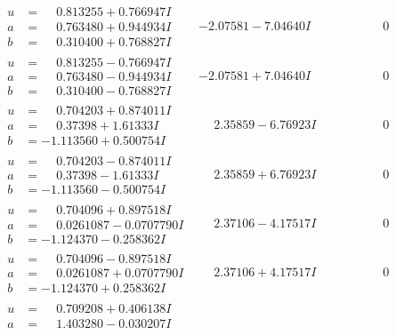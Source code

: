 \documentclass[1p]{elsarticle_modified}
\theoremstyle{definition}
\begin{document}
$$\begin{array}{c|c|c}
\begin{aligned}
u &= \phantom{-}0.813255 + 0.766947 I \\
a &= \phantom{-}0.763480 + 0.944934 I \\
b &= \phantom{-}0.310400 + 0.768827 I\end{aligned}
 & -2.07581 - 7.04640 I & \phantom{-0.000000 } 0 \\ \hline\begin{aligned}
u &= \phantom{-}0.813255 - 0.766947 I \\
a &= \phantom{-}0.763480 - 0.944934 I \\
b &= \phantom{-}0.310400 - 0.768827 I\end{aligned}
 & -2.07581 + 7.04640 I & \phantom{-0.000000 } 0 \\ \hline\begin{aligned}
u &= \phantom{-}0.704203 + 0.874011 I \\
a &= \phantom{-}0.37398 + 1.61333 I \\
b &= -1.113560 + 0.500754 I\end{aligned}
 & \phantom{-}2.35859 - 6.76923 I & \phantom{-0.000000 } 0 \\ \hline\begin{aligned}
u &= \phantom{-}0.704203 - 0.874011 I \\
a &= \phantom{-}0.37398 - 1.61333 I \\
b &= -1.113560 - 0.500754 I\end{aligned}
 & \phantom{-}2.35859 + 6.76923 I & \phantom{-0.000000 } 0 \\ \hline\begin{aligned}
u &= \phantom{-}0.704096 + 0.897518 I \\
a &= \phantom{-}0.0261087 - 0.0707790 I \\
b &= -1.124370 - 0.258362 I\end{aligned}
 & \phantom{-}2.37106 - 4.17517 I & \phantom{-0.000000 } 0 \\ \hline\begin{aligned}
u &= \phantom{-}0.704096 - 0.897518 I \\
a &= \phantom{-}0.0261087 + 0.0707790 I \\
b &= -1.124370 + 0.258362 I\end{aligned}
 & \phantom{-}2.37106 + 4.17517 I & \phantom{-0.000000 } 0 \\ \hline\begin{aligned}
u &= \phantom{-}0.709208 + 0.406138 I \\
a &= \phantom{-}1.403280 - 0.030207 I \\

\end{aligned}
\end{array}$$
\end{document}
